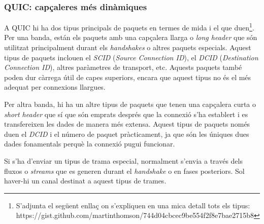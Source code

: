 \subsubsection{QUIC: capçaleres més dinàmiques}
{
    A QUIC hi ha dos tipus principals de paquets en termes de mida i el que duen\footnote{ S'adjunta el següent enllaç on s'expliquen en una mica
    detall tots els tipus: https://gist.github.com/martinthomson/744d04cbcec9be554f2f8e7bae2715b8}.
    Per una banda, están els paquets amb una capçalera llarga o
    \textit{long header} que són utilitzat principalment durant els \textit{handshakes} o altres paquets especials.
    Aquest tipus de paquets inclouen el \textit{SCID} (\textit{Source Connection ID}), el \textit{DCID}
    (\textit{Destination Connection ID}), altres paràmetres de transport, etc. Aquests paquets també poden dur càrrega útil de capes superiors, encara
    que aquest tipus no és el més adequat per connexions llargues.
    
    Per altra banda, hi ha un altre tipus de paquets que tenen una capçalera curta o \textit{short header} que sí que són emprats després que la
    connexió s'ha establert i es transfereixen les dades de manera més extensa. Aquest tipus de paquets només duen el \textit{DCID} i el número de paquet
    pràcticament, ja que són les úniques dues dades fonamentals perquè la connexió pugui funcionar.
    
    Si s'ha d'enviar un tipus de trama especial, normalment s'envia a través dels fluxos o \textit{streams} que es generen durant el \textit{handshake}
    o en fases posteriors. Sol haver-hi un canal destinat a aquest tipus de trames.
}

